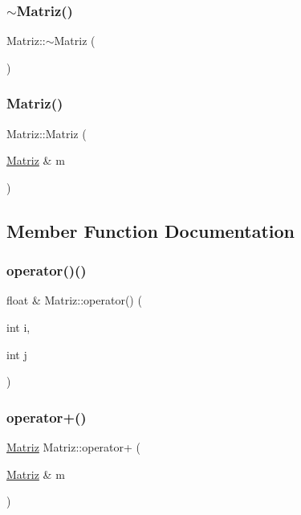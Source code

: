 \subsubsection{\texorpdfstring{$\sim$\+Matriz()}{~Matriz()}}
{\footnotesize\ttfamily Matriz\+::$\sim$\+Matriz (\begin{DoxyParamCaption}{ }\end{DoxyParamCaption})}

\mbox{\label{class_matriz_a8f3e37e196821d75d8043339fec10792}} 
\subsubsection{\texorpdfstring{Matriz()}{Matriz()}\hspace{0.1cm}{\footnotesize\ttfamily [2/2]}}
{\footnotesize\ttfamily Matriz\+::\+Matriz (\begin{DoxyParamCaption}\item[{\hyperlink{class_matriz}{Matriz} \&}]{m }\end{DoxyParamCaption})}



\subsection{Member Function Documentation}
\mbox{\label{class_matriz_a7a84e7fb199e8f55681ac1b594be7ee4}} 
\subsubsection{\texorpdfstring{operator()()}{operator()()}}
{\footnotesize\ttfamily float \& Matriz\+::operator() (\begin{DoxyParamCaption}\item[{int}]{i,  }\item[{int}]{j }\end{DoxyParamCaption})}

\mbox{\label{class_matriz_a101ba2a6272922ce7599bc05736186c8}} 
\subsubsection{\texorpdfstring{operator+()}{operator+()}}
{\footnotesize\ttfamily \hyperlink{class_matriz}{Matriz} Matriz\+::operator+ (\begin{DoxyParamCaption}\item[{\hyperlink{class_matriz}{Matriz} \&}]{m }\end{DoxyParamCaption})}

